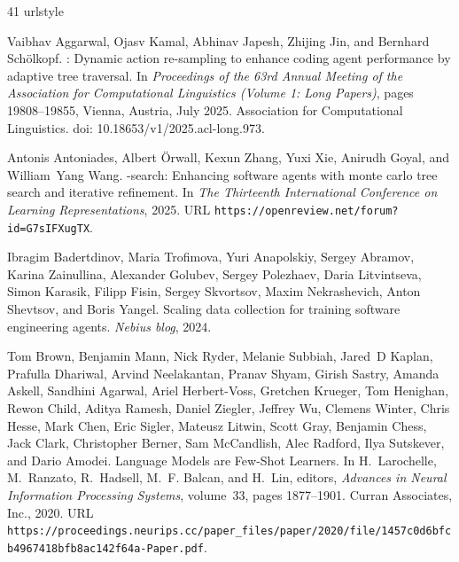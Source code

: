 \documentclass{article}
\begin{document}
\begin{thebibliography}{41}
\providecommand{\natexlab}[1]{#1}
\providecommand{\url}[1]{\texttt{#1}}
\expandafter\ifx\csname urlstyle\endcsname\relax
  \providecommand{\doi}[1]{doi: #1}\else
  \providecommand{\doi}{doi: \begingroup \urlstyle{rm}\Url}\fi

Vaibhav Aggarwal, Ojasv Kamal, Abhinav Japesh, Zhijing Jin, and Bernhard Sch{\"o}lkopf.
: Dynamic action re-sampling to enhance coding agent performance by adaptive tree traversal.
\newblock In \emph{Proceedings of the 63rd Annual Meeting of the Association for Computational Linguistics (Volume 1: Long Papers)}, pages 19808--19855, Vienna, Austria, July 2025. Association for Computational Linguistics.
\newblock \doi{10.18653/v1/2025.acl-long.973}.

Antonis Antoniades, Albert {\"O}rwall, Kexun Zhang, Yuxi Xie, Anirudh Goyal, and William~Yang Wang.
-search: Enhancing software agents with monte carlo tree search and iterative refinement.
\newblock In \emph{The Thirteenth International Conference on Learning Representations}, 2025.
\newblock URL \url{https://openreview.net/forum?id=G7sIFXugTX}.

Ibragim Badertdinov, Maria Trofimova, Yuri Anapolskiy, Sergey Abramov, Karina Zainullina, Alexander Golubev, Sergey Polezhaev, Daria Litvintseva, Simon Karasik, Filipp Fisin, Sergey Skvortsov, Maxim Nekrashevich, Anton Shevtsov, and Boris Yangel.
\newblock Scaling data collection for training software engineering agents.
\newblock \emph{Nebius blog}, 2024.

Tom Brown, Benjamin Mann, Nick Ryder, Melanie Subbiah, Jared~D Kaplan, Prafulla Dhariwal, Arvind Neelakantan, Pranav Shyam, Girish Sastry, Amanda Askell, Sandhini Agarwal, Ariel Herbert-Voss, Gretchen Krueger, Tom Henighan, Rewon Child, Aditya Ramesh, Daniel Ziegler, Jeffrey Wu, Clemens Winter, Chris Hesse, Mark Chen, Eric Sigler, Mateusz Litwin, Scott Gray, Benjamin Chess, Jack Clark, Christopher Berner, Sam McCandlish, Alec Radford, Ilya Sutskever, and Dario Amodei.
\newblock Language {Models} are {Few}-{Shot} {Learners}.
\newblock In H.~Larochelle, M.~Ranzato, R.~Hadsell, M.~F. Balcan, and H.~Lin, editors, \emph{Advances in {Neural} {Information} {Processing} {Systems}}, volume~33, pages 1877--1901. Curran Associates, Inc., 2020.
\newblock URL \url{https://proceedings.neurips.cc/paper_files/paper/2020/file/1457c0d6bfcb4967418bfb8ac142f64a-Paper.pdf}.


\end{thebibliography}
\end{document}
